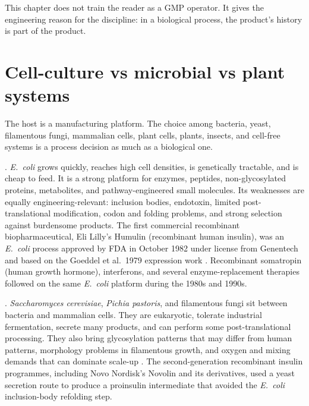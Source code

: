 This chapter does not train the reader as a GMP operator. It gives the
engineering reason for the discipline: in a biological process, the
product's history is part of the product.

\section{Cell-culture vs microbial vs plant systems}
\label{sec:vol06ch10:platforms}

The host is a manufacturing platform. The choice among bacteria, yeast,
filamentous fungi, mammalian cells, plant cells, plants, insects, and
cell-free systems is a process decision as much as a biological one.

. \emph{E.\ coli} grows quickly, reaches high
cell densities, is genetically tractable, and is cheap to feed. It is a
strong platform for enzymes, peptides, non-glycosylated proteins,
metabolites, and pathway-engineered small molecules. Its weaknesses are
equally engineering-relevant: inclusion bodies, endotoxin, limited
post-translational modification, codon and folding problems, and strong
selection against burdensome products. The first commercial recombinant
biopharmaceutical, Eli Lilly's Humulin (recombinant human insulin),
was an \emph{E.\ coli} process approved by FDA in October 1982 under
license from Genentech and based on the Goeddel et al.\ 1979 expression
work \cite{paper:v6c10-goeddel-insulin-1979,
paper:v6c10-humulin-eli-lilly-1982}. Recombinant somatropin (human
growth hormone), interferons, and several enzyme-replacement therapies
followed on the same \emph{E.\ coli} platform during the 1980s and
1990s.

. \emph{Saccharomyces cerevisiae},
\emph{Pichia pastoris}, and filamentous fungi sit between bacteria and
mammalian cells. They are eukaryotic, tolerate industrial fermentation,
secrete many products, and can perform some post-translational
processing. They also bring glycosylation patterns that may differ from
human patterns, morphology problems in filamentous growth, and oxygen
and mixing demands that can dominate scale-up
\cite{paper:v6c10-stockmann-pichia-2009}. The second-generation
recombinant insulin programmes, including Novo Nordisk's Novolin and
its derivatives, used a yeast secretion route to produce a proinsulin
intermediate that avoided the \emph{E.\ coli} inclusion-body refolding
step.

